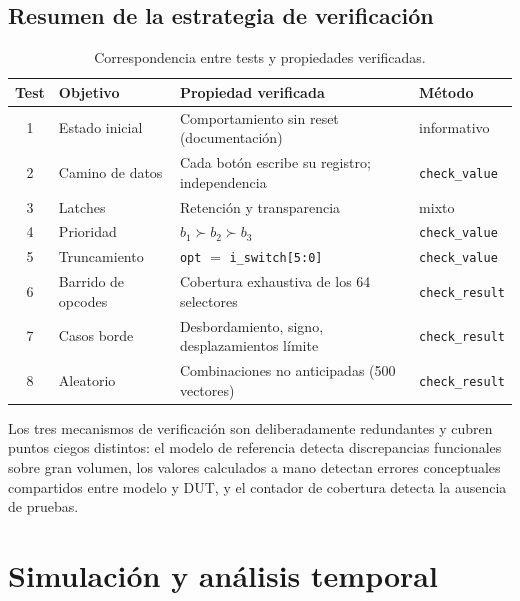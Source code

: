 \documentclass[12pt,a4paper]{article}
\begin{document}
\subsection{Resumen de la estrategia de verificación}

\begin{table}[H]
  \centering
  \small
  \begin{tabular}{clp{6.6cm}l}
    \toprule
    \textbf{Test} & \textbf{Objetivo} & \textbf{Propiedad verificada} & \textbf{Método} \\
    \midrule
    1 & Estado inicial       & Comportamiento sin reset (documentación)      & informativo \\
    2 & Camino de datos      & Cada botón escribe su registro; independencia & \texttt{check\_value} \\
    3 & Latches              & Retención y transparencia                     & mixto \\
    4 & Prioridad            & $b_1 \succ b_2 \succ b_3$                     & \texttt{check\_value} \\
    5 & Truncamiento         & \texttt{opt} $=$ \texttt{i\_switch[5:0]}      & \texttt{check\_value} \\
    6 & Barrido de opcodes   & Cobertura exhaustiva de los 64 selectores     & \texttt{check\_result} \\
    7 & Casos borde          & Desbordamiento, signo, desplazamientos límite & \texttt{check\_result} \\
    8 & Aleatorio            & Combinaciones no anticipadas (500 vectores)   & \texttt{check\_result} \\
    \bottomrule
  \end{tabular}
  \caption{Correspondencia entre tests y propiedades verificadas.}
  \label{tab:resumentests}
\end{table}

Los tres mecanismos de verificación son deliberadamente redundantes y cubren
puntos ciegos distintos: el modelo de referencia detecta discrepancias
funcionales sobre gran volumen, los valores calculados a mano detectan errores
conceptuales compartidos entre modelo y DUT, y el contador de cobertura detecta
la ausencia de pruebas.

\section{Simulación y análisis temporal}
\end{document}
